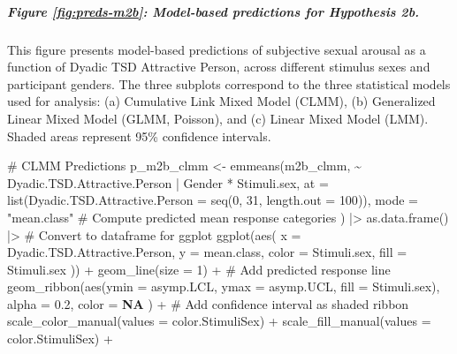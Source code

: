 \documentclass[
  bookmarksnumbered]{article}
\newenvironment{Shaded}{\begin{snugshade}}{\end{snugshade}}
\newcommand{\AttributeTok}[1]{\textcolor[rgb]{0.80,0.80,0.80}{#1}}
\newcommand{\CommentTok}[1]{\textcolor[rgb]{0.50,0.62,0.50}{#1}}
\newcommand{\ConstantTok}[1]{\textcolor[rgb]{0.86,0.64,0.64}{\textbf{#1}}}
\newcommand{\DecValTok}[1]{\textcolor[rgb]{0.86,0.86,0.80}{#1}}
\newcommand{\FloatTok}[1]{\textcolor[rgb]{0.75,0.75,0.82}{#1}}
\newcommand{\FunctionTok}[1]{\textcolor[rgb]{0.94,0.94,0.56}{#1}}
\newcommand{\NormalTok}[1]{\textcolor[rgb]{0.80,0.80,0.80}{#1}}
\newcommand{\OtherTok}[1]{\textcolor[rgb]{0.94,0.94,0.56}{#1}}
\newcommand{\SpecialCharTok}[1]{\textcolor[rgb]{0.86,0.64,0.64}{#1}}
\newcommand{\StringTok}[1]{\textcolor[rgb]{0.80,0.58,0.58}{#1}}
\begin{document}
\subparagraph{Figure \ref{fig:preds-m2b}: Model-based predictions for Hypothesis 2b.}\label{figure-reffigpreds-m2b-model-based-predictions-for-hypothesis-2b.}

This figure presents model-based predictions of subjective sexual arousal as a function of Dyadic TSD Attractive Person, across different stimulus sexes and participant genders. The three subplots correspond to the three statistical models used for analysis: (a) Cumulative Link Mixed Model (CLMM), (b) Generalized Linear Mixed Model (GLMM, Poisson), and (c) Linear Mixed Model (LMM). Shaded areas represent 95\% confidence intervals.

\begin{Shaded}
\begin{Highlighting}[]
\CommentTok{\# CLMM Predictions}
\NormalTok{p\_m2b\_clmm }\OtherTok{\textless{}{-}} \FunctionTok{emmeans}\NormalTok{(m2b\_clmm, }\SpecialCharTok{\textasciitilde{}}\NormalTok{ Dyadic.TSD.Attractive.Person }\SpecialCharTok{|}\NormalTok{ Gender }\SpecialCharTok{*}\NormalTok{ Stimuli.sex,}
  \AttributeTok{at =} \FunctionTok{list}\NormalTok{(}\AttributeTok{Dyadic.TSD.Attractive.Person =} \FunctionTok{seq}\NormalTok{(}\DecValTok{0}\NormalTok{, }\DecValTok{31}\NormalTok{, }\AttributeTok{length.out =} \DecValTok{100}\NormalTok{)),}
  \AttributeTok{mode =} \StringTok{"mean.class"} \CommentTok{\# Compute predicted mean response categories}
\NormalTok{) }\SpecialCharTok{|\textgreater{}}
  \FunctionTok{as.data.frame}\NormalTok{() }\SpecialCharTok{|\textgreater{}} \CommentTok{\# Convert to dataframe for ggplot}
  \FunctionTok{ggplot}\NormalTok{(}\FunctionTok{aes}\NormalTok{(}
    \AttributeTok{x =}\NormalTok{ Dyadic.TSD.Attractive.Person, }\AttributeTok{y =}\NormalTok{ mean.class,}
    \AttributeTok{color =}\NormalTok{ Stimuli.sex, }\AttributeTok{fill =}\NormalTok{ Stimuli.sex}
\NormalTok{  )) }\SpecialCharTok{+}
  \FunctionTok{geom\_line}\NormalTok{(}\AttributeTok{size =} \DecValTok{1}\NormalTok{) }\SpecialCharTok{+} \CommentTok{\# Add predicted response line}
  \FunctionTok{geom\_ribbon}\NormalTok{(}\FunctionTok{aes}\NormalTok{(}\AttributeTok{ymin =}\NormalTok{ asymp.LCL, }\AttributeTok{ymax =}\NormalTok{ asymp.UCL, }\AttributeTok{fill =}\NormalTok{ Stimuli.sex),}
    \AttributeTok{alpha =} \FloatTok{0.2}\NormalTok{, }\AttributeTok{color =} \ConstantTok{NA}
\NormalTok{  ) }\SpecialCharTok{+} \CommentTok{\# Add confidence interval as shaded ribbon}
  \FunctionTok{scale\_color\_manual}\NormalTok{(}\AttributeTok{values =}\NormalTok{ color.StimuliSex) }\SpecialCharTok{+}
  \FunctionTok{scale\_fill\_manual}\NormalTok{(}\AttributeTok{values =}\NormalTok{ color.StimuliSex) }\SpecialCharTok{+}

\end{Highlighting}
\end{Shaded}
\end{document}

